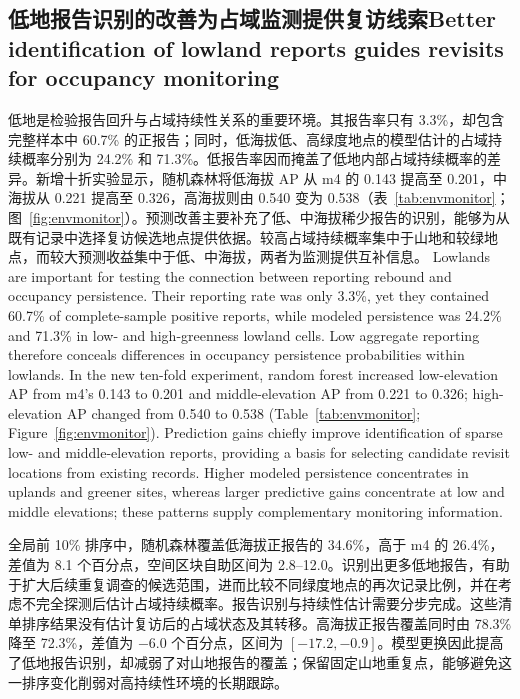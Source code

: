 \subsection{\ifzh 低地报告识别的改善为占域监测提供复访线索\else Better identification of lowland reports guides revisits for occupancy monitoring\fi}
\par
\ifzh
低地是检验报告回升与占域持续性关系的重要环境。其报告率只有 3.3\%，却包含完整样本中 60.7\% 的正报告；同时，低海拔低、高绿度地点的模型估计的占域持续概率分别为 24.2\% 和 71.3\%。低报告率因而掩盖了低地内部占域持续概率的差异。新增十折实验显示，随机森林将低海拔 AP 从 m4 的 0.143 提高至 0.201，中海拔从 0.221 提高至 0.326，高海拔则由 0.540 变为 0.538（表~\ref{tab:envmonitor}；图~\ref{fig:envmonitor}）。预测改善主要补充了低、中海拔稀少报告的识别，能够为从既有记录中选择复访候选地点提供依据。较高占域持续概率集中于山地和较绿地点，而较大预测收益集中于低、中海拔，两者为监测提供互补信息。
\else
Lowlands are important for testing the connection between reporting rebound and occupancy persistence. Their reporting rate was only 3.3\%, yet they contained 60.7\% of complete-sample positive reports, while modeled persistence was 24.2\% and 71.3\% in low- and high-greenness lowland cells. Low aggregate reporting therefore conceals differences in occupancy persistence probabilities within lowlands. In the new ten-fold experiment, random forest increased low-elevation AP from m4's 0.143 to 0.201 and middle-elevation AP from 0.221 to 0.326; high-elevation AP changed from 0.540 to 0.538 (Table~\ref{tab:envmonitor}; Figure~\ref{fig:envmonitor}). Prediction gains chiefly improve identification of sparse low- and middle-elevation reports, providing a basis for selecting candidate revisit locations from existing records. Higher modeled persistence concentrates in uplands and greener sites, whereas larger predictive gains concentrate at low and middle elevations; these patterns supply complementary monitoring information.
\fi
{}
\par
\ifzh
全局前 10\% 排序中，随机森林覆盖低海拔正报告的 34.6\%，高于 m4 的 26.4\%，差值为 8.1 个百分点，空间区块自助区间为 2.8--12.0。识别出更多低地报告，有助于扩大后续重复调查的候选范围，进而比较不同绿度地点的再次记录比例，并在考虑不完全探测后估计占域持续概率。报告识别与持续性估计需要分步完成。这些清单排序结果没有估计复访后的占域状态及其转移。高海拔正报告覆盖同时由 78.3\% 降至 72.3\%，差值为 $-6.0$ 个百分点，区间为 $[-17.2,-0.9]$。模型更换因此提高了低地报告识别，却减弱了对山地报告的覆盖；保留固定山地重复点，能够避免这一排序变化削弱对高持续性环境的长期跟踪。
